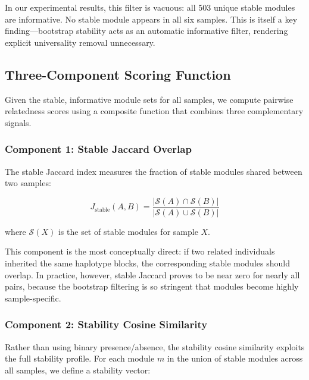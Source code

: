 \documentclass{../yalumba}
\begin{document}
In our experimental results, this filter is vacuous: all 503 unique stable
modules are informative.  No stable module appears in all six samples.  This
is itself a key finding---bootstrap stability acts as an automatic
informative filter, rendering explicit universality removal unnecessary.

\subsection{Three-Component Scoring Function}

Given the stable, informative module sets for all samples, we compute pairwise
relatedness scores using a composite function that combines three complementary
signals.

\subsubsection{Component 1: Stable Jaccard Overlap}

The stable Jaccard index measures the fraction of stable modules shared between
two samples:

\begin{equation}
  J_{\text{stable}}(A, B) =
  \frac{|\mathcal{S}(A) \cap \mathcal{S}(B)|}
       {|\mathcal{S}(A) \cup \mathcal{S}(B)|}
  \label{eq:stable-jaccard}
\end{equation}

where $\mathcal{S}(X)$ is the set of stable modules for sample $X$.


This component is the most conceptually direct: if two related individuals
inherited the same haplotype blocks, the corresponding stable modules should
overlap.  In practice, however, stable Jaccard proves to be near zero for
nearly all pairs, because the bootstrap filtering is so stringent that modules
become highly sample-specific.

\subsubsection{Component 2: Stability Cosine Similarity}

Rather than using binary presence/absence, the stability cosine similarity
exploits the full stability profile.  For each module $m$ in the union of
stable modules across all samples, we define a stability vector:
\end{document}
